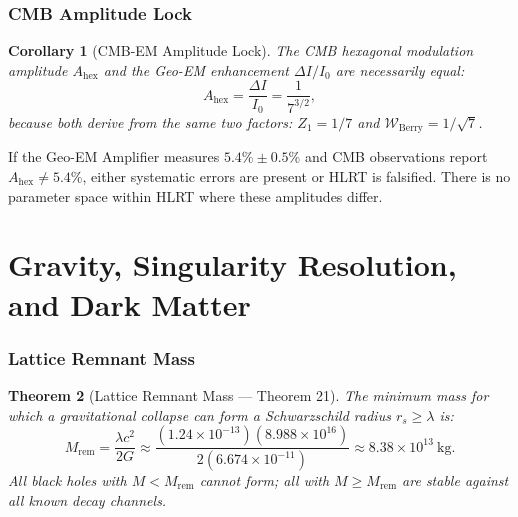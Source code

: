 \documentclass[11pt,letterpaper]{article}
\newtheorem{theorem}{Theorem}[section]
\newtheorem{corollary}[theorem]{Corollary}
\begin{document}
\section{CMB Amplitude Lock}

\begin{corollary}[CMB-EM Amplitude Lock]
The CMB hexagonal modulation amplitude $A_\mathrm{hex}$ and the Geo-EM
enhancement $\Delta I/I_0$ are necessarily equal:
\begin{equation}
  A_\mathrm{hex} = \frac{\Delta I}{I_0} = \frac{1}{7^{3/2}},
\end{equation}
because both derive from the same two factors: $Z_1 = 1/7$ and
$\mathcal{W}_\mathrm{Berry} = 1/\sqrt{7}$.
\end{corollary}

If the Geo-EM Amplifier measures $5.4\%\pm0.5\%$ and CMB observations
report $A_\mathrm{hex}\neq5.4\%$, either systematic errors are present
or HLRT is falsified.  There is no parameter space within HLRT where
these amplitudes differ.

%
%
\newpage
\part{Gravity, Singularity Resolution, and Dark Matter}

\section{Lattice Remnant Mass}

\begin{theorem}[Lattice Remnant Mass --- Theorem 21]\label{thm:T21}
The minimum mass for which a gravitational collapse can form a Schwarzschild
radius $r_s \geq \lambda$ is:
\begin{equation}
  M_\mathrm{rem} = \frac{\lambda c^2}{2G}
  \approx \frac{(1.24\times10^{-13})(8.988\times10^{16})}
               {2(6.674\times10^{-11})}
  \approx 8.38\times10^{13}~\text{kg}.
\end{equation}
All black holes with $M < M_\mathrm{rem}$ cannot form; all with
$M \geq M_\mathrm{rem}$ are stable against all known decay channels.
\end{theorem}
\end{document}
